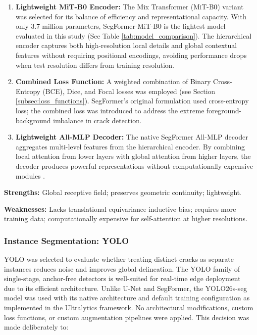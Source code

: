 \begin{enumerate}
    \item \textbf{Lightweight MiT-B0 Encoder:} The Mix Transformer (MiT-B0) variant was selected for its balance of efficiency and representational capacity. With only 3.7 million parameters, SegFormer-MiT-B0 is the lightest model evaluated in this study (See Table \ref{tab:model_comparison}). The hierarchical encoder captures both high-resolution local details and global contextual features without requiring positional encodings, avoiding performance drops when test resolution differs from training resolution.

    \item \textbf{Combined Loss Function:} A weighted combination of Binary Cross-Entropy (BCE), Dice, and Focal losses was employed (see Section \ref{subsec:loss_functions}). SegFormer's original formulation used cross-entropy loss; the combined loss was introduced to address the extreme foreground-background imbalance in crack detection.

    \item \textbf{Lightweight All-MLP Decoder:} The native SegFormer All-MLP decoder aggregates multi-level features from the hierarchical encoder. By combining local attention from lower layers with global attention from higher layers, the decoder produces powerful representations without computationally expensive modules \cite{32-xie-2021-segformer}.
\end{enumerate}

\textbf{Strengths:} Global receptive field; preserves geometric continuity; lightweight.

\textbf{Weaknesses:} Lacks translational equivariance inductive bias; requires more training data; computationally expensive for self-attention at higher resolutions.

\subsubsection{Instance Segmentation: YOLO}
\label{subsubsec:instance_segmentation_yolo}

\hs YOLO was selected to evaluate whether treating distinct cracks as separate instances reduces noise and improves global delineation. The YOLO family of single-stage, anchor-free detectors is well-suited for real-time edge deployment due to its efficient architecture. Unlike U-Net and SegFormer, the YOLO26s-seg model was used with its native architecture and default training configuration as implemented in the Ultralytics framework. No architectural modifications, custom loss functions, or custom augmentation pipelines were applied. This decision was made deliberately to:

